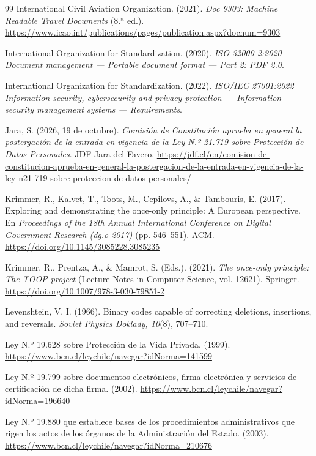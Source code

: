 \documentclass[11pt,a4paper]{article}
\begin{document}
\begin{thebibliography}{99}
International Civil Aviation Organization. (2021). \emph{Doc 9303: Machine Readable Travel Documents} (8.ª ed.). \url{https://www.icao.int/publications/pages/publication.aspx?docnum=9303}

International Organization for Standardization. (2020). \emph{ISO 32000-2:2020 Document management --- Portable document format --- Part 2: PDF 2.0}.

International Organization for Standardization. (2022). \emph{ISO/IEC 27001:2022 Information security, cybersecurity and privacy protection --- Information security management systems --- Requirements}.

Jara, S. (2026, 19 de octubre). \emph{Comisión de Constitución aprueba en general la postergación de la entrada en vigencia de la Ley N.º 21.719 sobre Protección de Datos Personales}. JDF Jara del Favero. \url{https://jdf.cl/en/comision-de-constitucion-aprueba-en-general-la-postergacion-de-la-entrada-en-vigencia-de-la-ley-n21-719-sobre-proteccion-de-datos-personales/}

Krimmer, R., Kalvet, T., Toots, M., Cepilovs, A., \& Tambouris, E. (2017). Exploring and demonstrating the once-only principle: A European perspective. En \emph{Proceedings of the 18th Annual International Conference on Digital Government Research (dg.o 2017)} (pp. 546--551). ACM. \url{https://doi.org/10.1145/3085228.3085235}

Krimmer, R., Prentza, A., \& Mamrot, S. (Eds.). (2021). \emph{The once-only principle: The TOOP project} (Lecture Notes in Computer Science, vol. 12621). Springer. \url{https://doi.org/10.1007/978-3-030-79851-2}

Levenshtein, V. I. (1966). Binary codes capable of correcting deletions, insertions, and reversals. \emph{Soviet Physics Doklady, 10}(8), 707--710.

Ley N.º 19.628 sobre Protección de la Vida Privada. (1999). \url{https://www.bcn.cl/leychile/navegar?idNorma=141599}

Ley N.º 19.799 sobre documentos electrónicos, firma electrónica y servicios de certificación de dicha firma. (2002). \url{https://www.bcn.cl/leychile/navegar?idNorma=196640}

Ley N.º 19.880 que establece bases de los procedimientos administrativos que rigen los actos de los órganos de la Administración del Estado. (2003). \url{https://www.bcn.cl/leychile/navegar?idNorma=210676}


\end{thebibliography}
\end{document}
